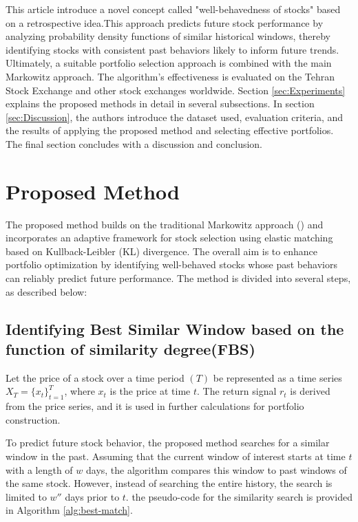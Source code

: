 \documentclass[preprint,12pt,authoryear]{elsarticle}
\begin{document}
This article introduce a novel concept called {\ttfamily"}well-behavedness of stocks{\ttfamily"} based on a retrospective idea.This approach predicts future stock performance by analyzing probability density functions of similar historical windows, thereby identifying stocks with consistent past behaviors likely to inform future trends. Ultimately, a suitable portfolio selection approach is combined with the main Markowitz approach. The algorithm's effectiveness is evaluated on the Tehran Stock Exchange and other stock exchanges worldwide. Section \ref{sec:Experiments} explains the proposed methods in detail in several subsections. In section \ref{sec:Discussion}, the authors introduce the dataset used, evaluation criteria, and the results of applying the proposed method and selecting effective portfolios. The final section concludes with a discussion and conclusion.

\section{Proposed Method}
\label{sec:Proposed}


The proposed method builds on the traditional Markowitz approach (\cite{markowitz1959portfolio}) and incorporates an adaptive framework for stock selection using elastic matching based on Kullback-Leibler (KL) divergence. The overall aim is to enhance portfolio optimization by identifying well-behaved stocks whose past behaviors can reliably predict future performance. The method is divided into several steps, as described below:


\subsection{Identifying Best Similar Window based on the function of similarity degree(FBS)}\label{sec:Find} 

Let the price of a stock over a time period $( T )$ be represented as a time series \( X_T = \{x_t\}_{t=1}^T \), where \( x_t \) is the price at time \( t \). The return signal \( r_t \) is derived from the price series, and it is used in further calculations for portfolio construction.

To predict future stock behavior, the proposed method searches for a similar window in the past. Assuming that the current window of interest starts at time \( t \) with a length of \( w \) days, the algorithm compares this window to past windows of the same stock. However, instead of searching the entire history, the search is limited to \( w'' \) days prior to \( t \).  the pseudo-code for the similarity search is provided in Algorithm \ref{alg:best-match}.
\end{document}
